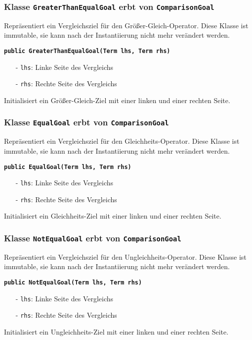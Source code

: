 \documentclass[parskip=full,11pt,twoside]{scrartcl}
\begin{document}
\subsubsection{Klasse \texttt{GreaterThanEqualGoal} erbt von \texttt{ComparisonGoal}}
Repräsentiert ein Vergleichsziel für den Größer-Gleich-Operator. Diese Klasse ist immutable, sie kann nach der Instantiierung nicht mehr verändert werden.

\textbf{\texttt{public GreaterThanEqualGoal(Term lhs, Term rhs)}}
\begin{itemize}[noitemsep]
	\item[-] \texttt{lhs}: Linke Seite des Vergleichs
	\item[-] \texttt{rhs}: Rechte Seite des Vergleichs
\end{itemize}
Initialisiert ein Größer-Gleich-Ziel mit einer linken und einer rechten Seite.

\subsubsection{Klasse \texttt{EqualGoal} erbt von \texttt{ComparisonGoal}}
Repräsentiert ein Vergleichsziel für den Gleichheits-Operator. Diese Klasse ist immutable, sie kann nach der Instantiierung nicht mehr verändert werden.

\textbf{\texttt{public EqualGoal(Term lhs, Term rhs)}}
\begin{itemize}[noitemsep]
	\item[-] \texttt{lhs}: Linke Seite des Vergleichs
	\item[-] \texttt{rhs}: Rechte Seite des Vergleichs
\end{itemize}
Initialisiert ein Gleichheits-Ziel mit einer linken und einer rechten Seite.

\subsubsection{Klasse \texttt{NotEqualGoal} erbt von \texttt{ComparisonGoal}}
Repräsentiert ein Vergleichsziel für den Ungleichheits-Operator. Diese Klasse ist immutable, sie kann nach der Instantiierung nicht mehr verändert werden.

\textbf{\texttt{public NotEqualGoal(Term lhs, Term rhs)}}
\begin{itemize}[noitemsep]
	\item[-] \texttt{lhs}: Linke Seite des Vergleichs
	\item[-] \texttt{rhs}: Rechte Seite des Vergleichs
\end{itemize}
Initialisiert ein Ungleichheits-Ziel mit einer linken und einer rechten Seite.
\end{document}
